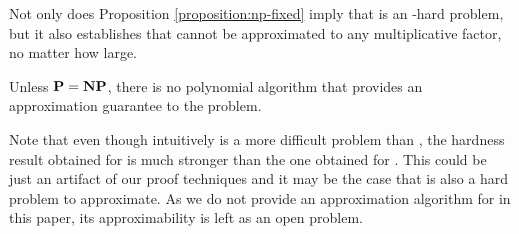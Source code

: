 Not only does Proposition \ref{proposition:np-fixed} imply that \prbrmfixed is an \np-hard problem, 
but it also establishes that \prbrmfixed cannot be approximated to any multiplicative factor, 
no matter how large.

\begin{corollary}
Unless $\textbf{P} = \textbf{NP}$, there is no polynomial 
algorithm
that provides an approximation guarantee
to the \prbrmfixed problem.
\end{corollary}

Note that even though intuitively 
\prbrm is a more difficult problem than \prbrmfixed, 
the hardness result obtained for \prbrmfixed is much stronger
than the one obtained for \prbrm.
This could be just an artifact of our proof techniques
and it may be the case that \prbrm is also a hard problem to approximate. 
As we do not provide an approximation algorithm for \prbrm in this paper, 
its approximability is left as an open problem.



